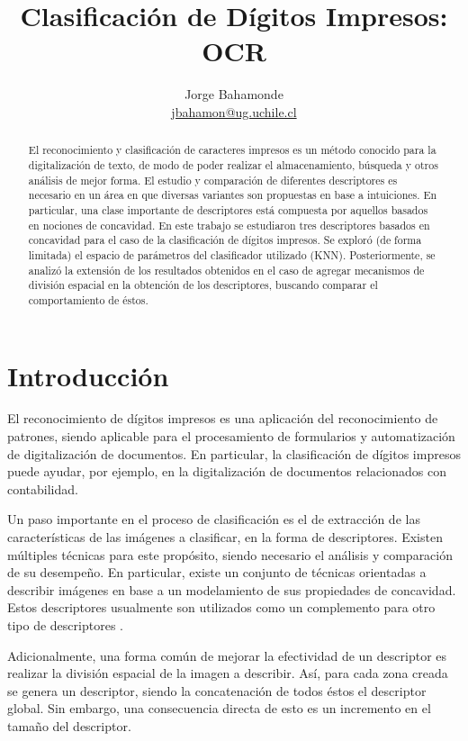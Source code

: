 \documentclass[12pt]{article}
\title{Clasificación de Dígitos Impresos: OCR}
\author{Jorge Bahamonde\\
\small{\url{jbahamon@ug.uchile.cl}}}
\date{}
\begin{document}
\maketitle

\begin{abstract}
    El reconocimiento y clasificación de caracteres impresos es un método
    conocido para la digitalización de texto, de modo de poder realizar el
    almacenamiento, búsqueda y otros análisis de mejor forma.  El estudio y
    comparación de diferentes descriptores es necesario en un área en que
    diversas variantes son propuestas en base a intuiciones. En particular, una
    clase importante de descriptores está compuesta por aquellos basados en
    nociones de concavidad. En este trabajo se estudiaron tres descriptores
    basados en concavidad para el caso de la clasificación de dígitos impresos.
    Se exploró (de forma limitada) el espacio de parámetros del clasificador
    utilizado (KNN). Posteriormente, se analizó la extensión de los resultados
    obtenidos en el caso de agregar mecanismos de división espacial en la
    obtención de los descriptores, buscando comparar el comportamiento de éstos.
\end{abstract}

\section{Introducción}

El reconocimiento de dígitos impresos es una aplicación del reconocimiento de
patrones, siendo aplicable para el procesamiento de formularios y automatización
de digitalización de documentos. En particular, la clasificación de dígitos
impresos puede ayudar, por ejemplo, en la digitalización de documentos
relacionados con contabilidad.

Un paso importante en el proceso de clasificación es el de extracción de las
características de las imágenes a clasificar, en la forma de descriptores.
Existen múltiples técnicas para este propósito, siendo necesario el análisis y
comparación de su desempeño. En particular, existe un conjunto de técnicas
orientadas a describir imágenes en base a un modelamiento de sus propiedades de
concavidad. Estos descriptores usualmente son utilizados como un complemento
para otro tipo de descriptores \cite{conc}.

Adicionalmente, una forma común de mejorar la efectividad de un descriptor es
realizar la división espacial de la imagen a describir. Así, para cada zona
creada se genera un descriptor, siendo la concatenación de todos éstos el
descriptor global. Sin embargo, una consecuencia directa de esto es un
incremento en el tamaño del descriptor.
\end{document}

